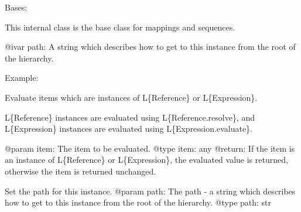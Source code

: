 \documentclass[a4paper,10pt,english]{sphinxmanual}
\begin{document}
\begin{fulllineitems}
\label{\detokenize{apidoc_src/src:src.pyconf.Container}}
Bases: 

This internal class is the base class for mappings and sequences.

@ivar path: A string which describes how to get
to this instance from the root of the hierarchy.

Example:

%
\begin{sphinxVerbatim}[commandchars=\\\{\}]
\PYG{p}{[}\PYG{p}{]}\PYG{p}{[}\PYG{p}{]}
\end{sphinxVerbatim}

\begin{fulllineitems}
\label{\detokenize{apidoc_src/src:src.pyconf.Container.evaluate}}
Evaluate items which are instances of L\{Reference\} or L\{Expression\}.

L\{Reference\} instances are evaluated using L\{Reference.resolve\},
and L\{Expression\} instances are evaluated using
L\{Expression.evaluate\}.

@param item: The item to be evaluated.
@type item: any
@return: If the item is an instance of L\{Reference\} or L\{Expression\},
the evaluated value is returned, otherwise the item is returned
unchanged.

\end{fulllineitems}


\begin{fulllineitems}
\label{\detokenize{apidoc_src/src:src.pyconf.Container.setPath}}
Set the path for this instance.
@param path: The path - a string which describes how to get
to this instance from the root of the hierarchy.
@type path: str

\end{fulllineitems}


\end{fulllineitems}
\end{document}
